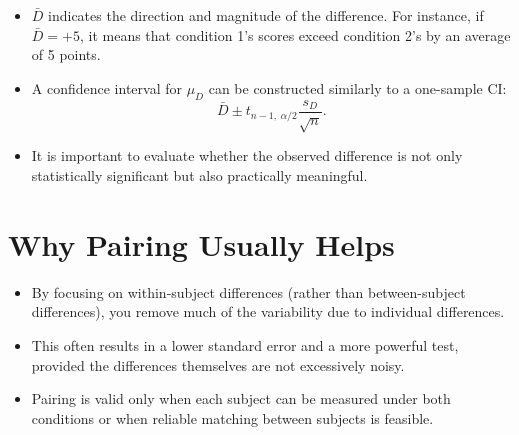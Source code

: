\documentclass[10pt]{extarticle}
\begin{document}
\begin{itemize}
    \item $\bar{D}$ indicates the direction and magnitude of the difference. For instance, if $\bar{D} = +5$, it means that condition 1’s scores exceed condition 2’s by an average of 5 points.
    \item A confidence interval for $\mu_D$ can be constructed similarly to a one-sample CI:
    \[
    \bar{D} \pm t_{n-1,\;\alpha/2} \frac{s_D}{\sqrt{n}}.
    \]
    \item It is important to evaluate whether the observed difference is not only statistically significant but also practically meaningful.
\end{itemize}

\bigskip

\section{Why Pairing Usually Helps}
\begin{itemize}
    \item By focusing on within-subject differences (rather than between-subject differences), you remove much of the variability due to individual differences.
    \item This often results in a lower standard error and a more powerful test, provided the differences themselves are not excessively noisy.
    \item Pairing is valid only when each subject can be measured under both conditions or when reliable matching between subjects is feasible.
\end{itemize}

\bigskip
\end{document}
